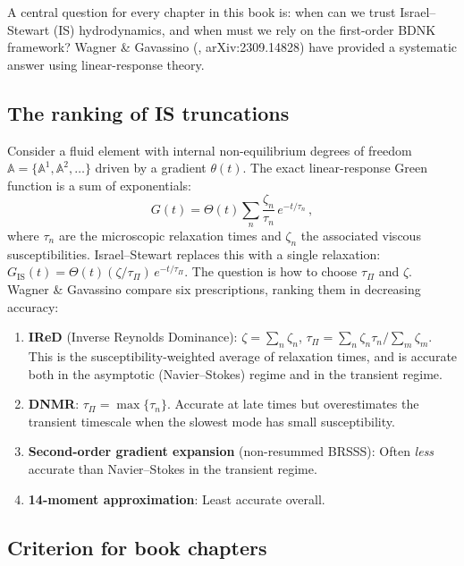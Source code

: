 A central question for every chapter in this book is: when can we trust
Israel--Stewart (IS) hydrodynamics, and when must we rely on the
first-order BDNK framework?  Wagner \& Gavassino
(\citealt{WagnerGavassinoRegime2024}, arXiv:2309.14828) have provided a
systematic answer using linear-response theory.

\subsection{The ranking of IS truncations}

Consider a fluid element with internal non-equilibrium degrees of freedom
$\mathbb{A} = \{\mathbb{A}^1, \mathbb{A}^2, \ldots\}$ driven by a
gradient $\theta(t)$.  The exact linear-response Green function is a sum
of exponentials:
\begin{equation}
\label{eq:rel-Green-exact}
G(t) = \Theta(t)\sum_n \frac{\zeta_n}{\tau_n}\,e^{-t/\tau_n}\,,
\end{equation}
where $\tau_n$ are the microscopic relaxation times and $\zeta_n$ the
associated viscous susceptibilities.  Israel--Stewart replaces this with
a single relaxation:
$G_{\mathrm{IS}}(t) = \Theta(t)(\zeta/\tau_\Pi)\,e^{-t/\tau_\Pi}$.
The question is how to choose $\tau_\Pi$ and $\zeta$.  Wagner \& Gavassino
compare six prescriptions, ranking them in decreasing accuracy:
\begin{enumerate}
\item \textbf{IReD} (Inverse Reynolds Dominance): $\zeta = \sum_n \zeta_n$,
  $\tau_\Pi = \sum_n \zeta_n \tau_n / \sum_m \zeta_m$.  This is the
  susceptibility-weighted average of relaxation times, and is accurate
  both in the asymptotic (Navier--Stokes) regime and in the transient regime.
\item \textbf{DNMR}: $\tau_\Pi = \max\{\tau_n\}$.  Accurate at late
  times but overestimates the transient timescale when the slowest mode
  has small susceptibility.
\item \textbf{Second-order gradient expansion} (non-resummed BRSSS):
  Often \emph{less} accurate than Navier--Stokes in the transient regime.
\item \textbf{14-moment approximation}: Least accurate overall.
\end{enumerate}

\subsection{Criterion for book chapters}

